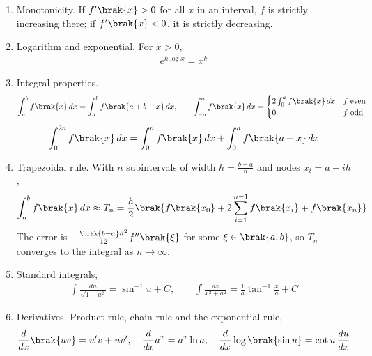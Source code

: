\begin{enumerate}[label=\thesubsection.\arabic*, ref=\thesubsection.\theenumi]
\item Monotonicity. If $f^{\prime}\brak{x} > 0$ for all $x$ in an interval, $f$ is strictly increasing there; if $f^{\prime}\brak{x} < 0$, it is strictly decreasing. 
\item Logarithm and exponential. For $x > 0$,
\begin{align}
	e^{k\log x} = x^k \label{eq:CBSE12-explog}
\end{align}
\item Integral properties.
\begin{align}
	\int_a^b f\brak{x}\,dx = \int_a^b f\brak{a+b-x}\,dx, \qquad
	\int_{-a}^{a} f\brak{x}\,dx = \begin{cases} 2\int_0^a f\brak{x}\,dx & f \text{ even} \\ 0 & f \text{ odd} \end{cases} \label{eq:CBSE12-intprop}
\end{align}
\begin{align}
	\int_0^{2a} f\brak{x}\,dx = \int_0^{a} f\brak{x}\,dx + \int_0^{a} f\brak{a+x}\,dx \label{eq:CBSE12-split}
\end{align}
\item Trapezoidal rule. With $n$ subintervals of width $h = \frac{b-a}{n}$ and nodes $x_i = a + ih$,
\begin{align}
	\int_a^b f\brak{x}\,dx \approx T_n = \frac{h}{2}\brak{f\brak{x_0} + 2\sum_{i=1}^{n-1}f\brak{x_i} + f\brak{x_n}} \label{eq:CBSE12-trap}
\end{align}
The error is $-\frac{\brak{b-a}h^2}{12}f^{\prime\prime}\brak{\xi}$ for some $\xi \in \brak{a,b}$, so $T_n$ converges to the integral as $n \to \infty$.
\item Standard integrals,
\begin{align}
	\int \frac{du}{\sqrt{1-u^2}} = \sin^{-1}u + C, \qquad
	\int \frac{dx}{x^2+a^2} = \frac{1}{a}\tan^{-1}\frac{x}{a} + C \label{eq:CBSE12-standard}
\end{align}

\item Derivatives. Product rule, chain rule and the exponential rule,
\begin{align}
	\frac{d}{dx}\brak{uv} = u^{\prime}v + uv^{\prime}, \quad
	\frac{d}{dx}a^x = a^x\ln a, \quad
	\frac{d}{dx}\log\brak{\sin u} = \cot u\,\frac{du}{dx} \label{eq:CBSE12-deriv}
\end{align}


\end{enumerate}
